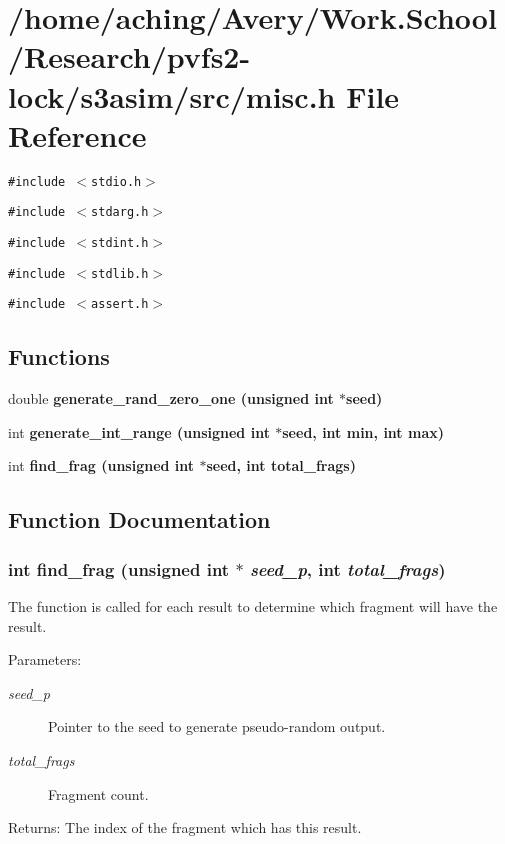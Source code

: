 \section{/home/aching/Avery/Work.School/Research/pvfs2-lock/s3asim/src/misc.h File Reference}
\label{misc_8h}
{\tt \#include $<$stdio.h$>$}\par
{\tt \#include $<$stdarg.h$>$}\par
{\tt \#include $<$stdint.h$>$}\par
{\tt \#include $<$stdlib.h$>$}\par
{\tt \#include $<$assert.h$>$}\par
\subsection*{Functions}
\begin{CompactItemize}
\item 
double \bf{generate\_\-rand\_\-zero\_\-one} (unsigned int $\ast$seed)
\item 
int \bf{generate\_\-int\_\-range} (unsigned int $\ast$seed, int min, int max)
\item 
int \bf{find\_\-frag} (unsigned int $\ast$seed, int total\_\-frags)
\end{CompactItemize}


\subsection{Function Documentation}
\subsubsection{\setlength{\rightskip}{0pt plus 5cm}int find\_\-frag (unsigned int $\ast$ {\em seed\_\-p}, int {\em total\_\-frags})}\label{misc_8h_7a1f944a01e9d2649fde7024bd282bf0}


The function is called for each result to determine which fragment will have the result.

\begin{Desc}
\item[Parameters:]
\begin{description}
\item[{\em seed\_\-p}]Pointer to the seed to generate pseudo-random output. \item[{\em total\_\-frags}]Fragment count. \end{description}
\end{Desc}
\begin{Desc}
\item[Returns:]The index of the fragment which has this result. \end{Desc}
